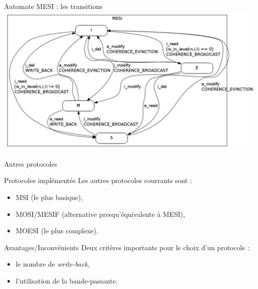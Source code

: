 \begin{frame}{Automate MESI : les transitions}
    \includegraphics[scale=.3]{images/MESI_simple.png}
\end{frame}

\begin{frame}{Autres protocoles}
  \begin{block}{Protocoles implémentés}
    Les autres protocoles courrants sont :
    \begin{itemize}
    \item{MSI (le plus basique),}
    \item{MOSI/MESIF (alternative presqu'équivalente à MESI),}
    \item{MOESI (le plus complexe).}
    \end{itemize}
  \end{block}
  
  \begin{block}{Avantages/Inconvénients}
    Deux critères importants pour le choix d'un protocole :
    \begin{itemize}
    \item{le nombre de \emph{write-back},}
    \item{l'utilisation de la bande-passante.}
    \end{itemize}
  \end{block}
\end{frame}

